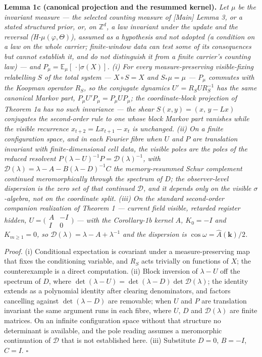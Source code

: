 \documentclass[
]{article}
\begin{document}
\textbf{Lemma 1c (canonical projection and the resummed kernel).}
\emph{Let \(\mu\) be the invariant measure --- the selected counting
measure of {[}Main{]} Lemma 3, or a stated structured prior, or, on
\(\mathbb{Z}^d\), a law invariant under the update and the reversal
(H-\(\mu(\varphi,\Theta)\)), assumed as a hypothesis and not adopted (a
condition on a law on the whole carrier; finite-window data can test
some of its consequences but cannot establish it, and do not distinguish
it from a finite carrier's counting law) --- and
\(P_\mu=\mathbb E_\mu[\,\cdot\mid\sigma(X)]\). (i) For every
measure-preserving visible-fixing relabelling \(S\) of the total system
--- \(X\circ S=X\) and \(S_*\mu=\mu\) --- \(P_\mu\) commutes with the
Koopman operator \(R_S\), so the conjugate dynamics \(U'=R_SUR_S^{-1}\)
has the same canonical Markov part, \(P_\mu U'P_\mu=P_\mu UP_\mu\); the
coordinate-block projection of Theorem 1a has no such invariance --- the
shear \(S(x,y)=(x,\,y-Lx)\) conjugates the second-order rule to one
whose block Markov part vanishes while the visible recurrence
\(x_{t+2}=Lx_{t+1}-x_t\) is unchanged. (ii) On a finite configuration
space, and in each Fourier fibre when \(U\) and \(P\) are translation
invariant with finite-dimensional cell data, the visible poles are the
poles of the reduced resolvent
\(P(\lambda-U)^{-1}P=\mathcal D(\lambda)^{-1}\), with
\(\mathcal D(\lambda)=\lambda-A-B(\lambda-D)^{-1}C\) the memory-resummed
Schur complement continued meromorphically through the spectrum of
\(D\); the observer-level dispersion is the zero set of that continued
\(\mathcal D\), and it depends only on the visible \(\sigma\)-algebra,
not on the coordinate split. (iii) On the standard second-order
companion realization of Theorem 1 --- current field visible, retarded
register hidden,
\(U=\bigl(\begin{smallmatrix}A&-I\\ I&0\end{smallmatrix}\bigr)\) ---
with the Corollary-1b kernel \(A\), \(K_0=-I\) and \(K_{m\ge1}=0\), so
\(\mathcal D(\lambda)=\lambda-A+\lambda^{-1}\) and the dispersion is
\(\cos\omega=\widehat A(\mathbf k)/2\).}

\emph{Proof.} (i) Conditional expectation is covariant under a
measure-preserving map that fixes the conditioning variable, and \(R_S\)
acts trivially on functions of \(X\); the counterexample is a direct
computation. (ii) Block inversion of \(\lambda-U\) off the spectrum of
\(D\), where \(\det(\lambda-U)=\det(\lambda-D)\det\mathcal D(\lambda)\);
the identity extends as a polynomial identity after clearing
denominators, and factors cancelling against \(\det(\lambda-D)\) are
removable; when \(U\) and \(P\) are translation invariant the same
argument runs in each fibre, where \(U\), \(D\) and
\(\mathcal D(\lambda)\) are finite matrices. On an infinite
configuration space without that structure no determinant is available,
and the pole reading assumes a meromorphic continuation of
\(\mathcal D\) that is not established here. (iii) Substitute \(D=0\),
\(B=-I\), \(C=I\). \(\square\)
\end{document}
